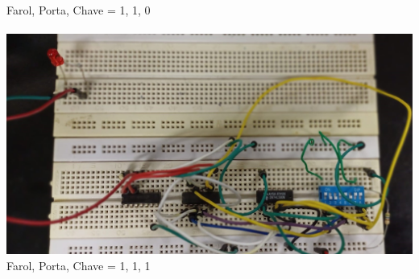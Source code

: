 \documentclass[]{article}
\begin{document}
		Farol, Porta, Chave = {1, 1, 0} \\ \\
		\includegraphics[scale=0.25]{Images/Protoboard 111.jpg} \\
		Farol, Porta, Chave = {1, 1, 1} \\ \\
\end{document}
